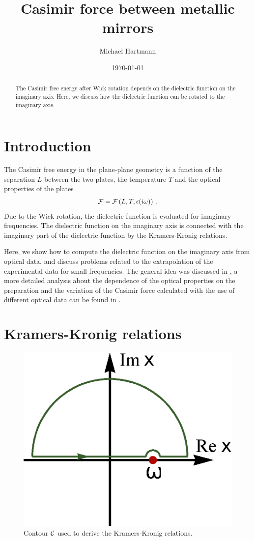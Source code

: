\documentclass[twocolumn,superscriptaddress,pre]{revtex4-1}
\begin{document}
\title{Casimir force between metallic mirrors}

\author{Michael Hartmann}

\date{\today}

\begin{abstract}
The Casimir free energy after Wick rotation depends on the dielectric function
on the imaginary axis. Here, we discuss how the dielectric function can be
rotated to the imaginary axis.
\end{abstract}

\maketitle

\section{Introduction}

The Casimir free energy in the plane-plane geometry is a function of the
separation $L$ between the two plates, the temperature $T$ and the optical
properties of the plates
\begin{equation}
{\cal F} = {\cal F}\left(L,T,\epsilon(i\omega)\right) \,.
\end{equation}
Due to the Wick rotation, the dielectric function is evaluated for imaginary
frequencies. The dielectric function on the imaginary axis is connected with
the imaginary part of the dielectric function by the Kramers-Kronig relations.

Here, we show how to compute the dielectric function on the imaginary axis from
optical data, and discuss problems related to the extrapolation of the
experimental data for small frequencies. The general idea was discussed in
\cite{Lambrecht2000}, a more detailed analysis about the dependence of the
optical properties on the preparation and the variation of the Casimir force
calculated with the use of different optical data can be found in
\cite{Pirozhenko2006}.

\section{Kramers-Kronig relations}

\begin{figure}
\includegraphics[width=0.5\columnwidth]{img/contour.eps}
\caption{Contour $\cal C$ used to derive the Kramers-Kronig relations.}
\label{fig:contour}
\end{figure}
\end{document}
